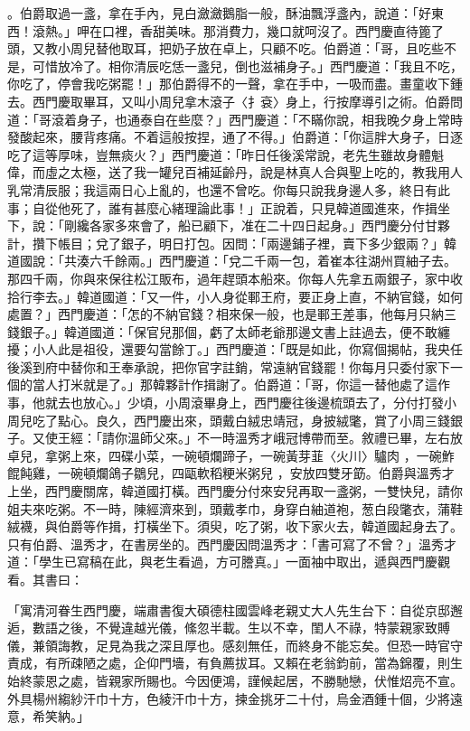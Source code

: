 。伯爵取過一盞，拿在手內，見白瀲瀲鵝脂一般，酥油飄浮盞內，說道：「好東西！滾熱。」呷在口裡，香甜美味。那消費力，幾口就呵沒了。西門慶直待篦了頭，又教小周兒替他取耳，把奶子放在卓上，只顧不吃。伯爵道：「哥，且吃些不是，可惜放冷了。相你清辰吃恁一盞兒，倒也滋補身子。」西門慶道：「我且不吃，你吃了，停會我吃粥罷！」那伯爵得不的一聲，拿在手中，一吸而盡。畫童收下鍾去。西門慶取畢耳，又叫小周兒拿木滾子〈扌袞〉身上，行按摩導引之術。伯爵問道：「哥滾着身子，也通泰自在些麼？」西門慶道：「不瞞你說，相我晚夕身上常時發酸起來，腰背疼痛。不着這般按捏，通了不得。」伯爵道：「你這胖大身子，日逐吃了這等厚味，豈無痰火？」西門慶道：「昨日任後溪常說，老先生雖故身體魁偉，而虛之太極，送了我一罐兒百補延齡丹，說是林真人合與聖上吃的，教我用人乳常清辰服；我這兩日心上亂的，也還不曾吃。你每只說我身邊人多，終日有此事；自從他死了，誰有甚麼心緒理論此事！」正說着，只見韓道國進來，作揖坐下，說：「剛纔各家多來會了，船已顧下，准在二十四日起身。」西門慶分付甘夥計，攢下帳目；兌了銀子，明日打包。因問：「兩邊鋪子裡，賣下多少銀兩？」韓道國說：「共湊六千餘兩。」西門慶道：「兌二千兩一包，着崔本往湖州買紬子去。那四千兩，你與來保往松江販布，過年趕頭本船來。你每人先拿五兩銀子，家中收拾行李去。」韓道國道：「又一件，小人身從鄆王府，要正身上直，不納官錢，如何處置？」西門慶道：「怎的不納官錢？相來保一般，也是鄆王差事，他每月只納三錢銀子。」韓道國道：「保官兒那個，虧了太師老爺那邊文書上註過去，便不敢纏擾；小人此是祖役，還要勾當餘丁。」西門慶道：「既是如此，你寫個揭帖，我央任後溪到府中替你和王奉承說，把你官字註銷，常遠納官錢罷！你每月只委付家下一個的當人打米就是了。」那韓夥計作揖謝了。伯爵道：「哥，你這一替他處了這作事，他就去也放心。」少頃，小周滾畢身上，西門慶往後邊梳頭去了，分付打發小周兒吃了點心。良久，西門慶出來，頭戴白絨忠靖冠，身披絨氅，賞了小周三錢銀子。又使王經：「請你溫師父來。」不一時溫秀才峨冠博帶而至。敘禮已畢，左右放卓兒，拿粥上來，四碟小菜，一碗頓爛蹄子，一碗黃芽韮〈火川〉驢肉 ，一碗鮓餛飩雞，一碗頓爛鴿子鶵兒，四甌軟稻粳米粥兒 ，安放四雙牙筯。伯爵與溫秀才上坐，西門慶關席，韓道國打橫。西門慶分付來安兒再取一盞粥，一雙快兒，請你姐夫來吃粥。不一時，陳經濟來到，頭戴孝巾，身穿白紬道袍，葱白段氅衣，蒲鞋絨襪，與伯爵等作揖，打橫坐下。須臾，吃了粥，收下家火去，韓道國起身去了。只有伯爵、溫秀才，在書房坐的。西門慶因問溫秀才：「書可寫了不曾？」溫秀才道：「學生已寫稿在此，與老生看過，方可謄真。」一面袖中取出，遞與西門慶觀看。其書曰：

「寓清河眷生西門慶，端肅書復大碩德柱國雲峰老親丈大人先生台下：自從京邸邂逅，數語之後，不覺違越光儀，絛忽半載。生以不幸，閨人不祿，特蒙親家致賻儀，兼領誨教，足見為我之深且厚也。感刻無任，而終身不能忘矣。但恐一時官守責成，有所疎陋之處，企仰門墻，有負薦拔耳。又賴在老翁鈞前，當為錦覆，則生始終蒙恩之處，皆親家所賜也。今因便鴻，謹候起居，不勝馳戀，伏惟炤亮不宣。外具楊州縐紗汗巾十方，色綾汗巾十方，揀金挑牙二十付，烏金酒鍾十個，少將遠意，希笑納。」

